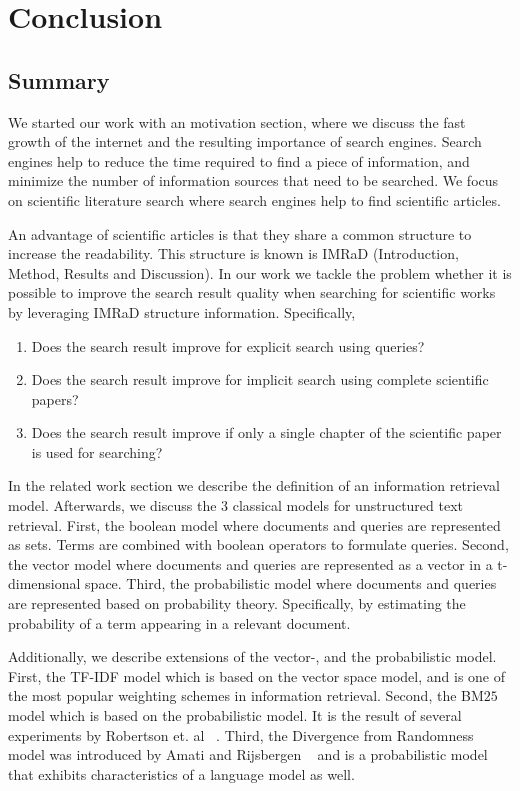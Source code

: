 \chapter{Conclusion}
\label{cha:conclusion}


\section{Summary}
\label{sec:summary}

We started our work with an motivation section, where we discuss the fast growth of the internet and the resulting importance of search engines. Search engines help to reduce the time required to find a piece of information, and minimize the number of information sources that need to be searched. We focus on scientific literature search where search engines help to find scientific articles.

An advantage of scientific articles is that they share a common structure to increase the readability. This structure is known is IMRaD (Introduction, Method, Results and Discussion). In our work we tackle the problem whether it is possible to improve the search result quality when searching for scientific works by leveraging IMRaD structure information. Specifically,
\begin{enumerate}[label=(\alph*)]
  \item Does the search result improve for explicit search using queries?
  \item Does the search result improve for implicit search using complete scientific papers?
  \item Does the search result improve if only a single chapter of the scientific paper is used for searching?
\end{enumerate}
In the related work section we describe the definition of an information retrieval model. Afterwards, we discuss the $3$ classical models for unstructured text retrieval. First, the boolean model where documents and queries are represented as sets. Terms are combined with boolean operators to formulate queries. Second, the vector model where documents and queries are represented as a vector in a t-dimensional space. Third, the probabilistic model where documents and queries are represented based on probability theory. Specifically, by estimating the probability of a term appearing in a relevant document.

Additionally, we describe extensions of the vector-, and the probabilistic model. First, the TF-IDF model which is based on the vector space model, and is one of the most popular weighting schemes in information retrieval. Second, the BM$25$ model which is based on the probabilistic model. It is the result of several experiments by Robertson et. al ~\cite{RobertsonWHGL92, RobertsonWJHG93, RobertsonWJHG94}. Third, the Divergence from Randomness model was introduced by Amati and Rijsbergen ~\cite{AmatiR02} and is a probabilistic model that exhibits characteristics of a language model as well.

